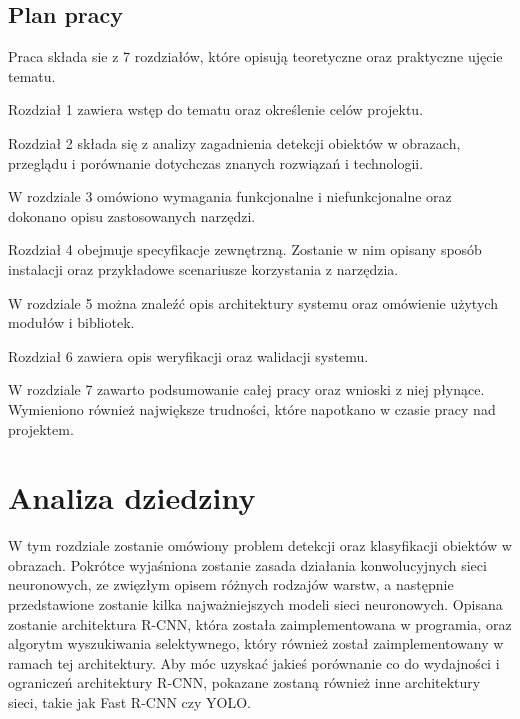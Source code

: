 \documentclass[a4paper,twoside,12pt]{book}
\begin{document}
\section{Plan pracy}
{Praca składa sie z 7 rozdziałów, które opisują teoretyczne oraz praktyczne ujęcie tematu.}

{Rozdział 1 zawiera wstęp do tematu oraz określenie celów projektu.}

{Rozdział 2 składa się z analizy zagadnienia detekcji obiektów w obrazach, przeglądu i porównanie dotychczas znanych rozwiązań i technologii.}

{W rozdziale 3 omówiono wymagania funkcjonalne i niefunkcjonalne oraz dokonano opisu zastosowanych narzędzi.}

{Rozdział 4 obejmuje specyfikacje zewnętrzną. Zostanie w nim opisany sposób instalacji oraz przykładowe scenariusze korzystania z narzędzia.}

{W rozdziale 5 można znaleźć opis architektury systemu oraz omówienie użytych modułów i bibliotek.}

{Rozdział 6 zawiera opis weryfikacji oraz walidacji systemu.}

{W rozdziale 7 zawarto podsumowanie całej pracy oraz wnioski z niej płynące. Wymieniono również największe trudności, które napotkano w czasie pracy nad projektem.}



\chapter{Analiza dziedziny}
{W tym rozdziale zostanie omówiony problem detekcji oraz klasyfikacji obiektów w obrazach. Pokrótce wyjaśniona zostanie zasada działania konwolucyjnych sieci neuronowych, ze zwięzłym opisem różnych rodzajów warstw, a następnie przedstawione zostanie kilka najważniejszych modeli sieci neuronowych. Opisana zostanie architektura R-CNN, która została zaimplementowana w programia, oraz algorytm wyszukiwania selektywnego, który również został zaimplementowany w ramach tej architektury. Aby móc uzyskać jakieś porównanie co do wydajności i ograniczeń architektury R-CNN,  pokazane zostaną również inne architektury sieci, takie jak Fast R-CNN czy YOLO.}
\end{document}
